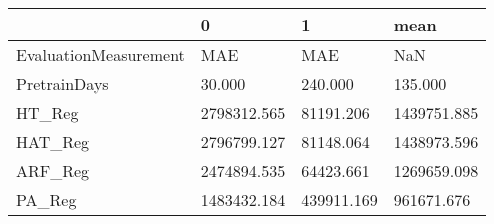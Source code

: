 \begin{tabular}{llll}
\toprule
{} &            0 &           1 &         mean \\
\midrule
EvaluationMeasurement &          MAE &         MAE &          NaN \\
PretrainDays          &       30.000 &     240.000 &      135.000 \\
HT\_Reg                &  2798312.565 &   81191.206 &  1439751.885 \\
HAT\_Reg               &  2796799.127 &   81148.064 &  1438973.596 \\
ARF\_Reg               &  2474894.535 &   64423.661 &  1269659.098 \\
PA\_Reg                &  1483432.184 &  439911.169 &   961671.676 \\
\bottomrule
\end{tabular}

